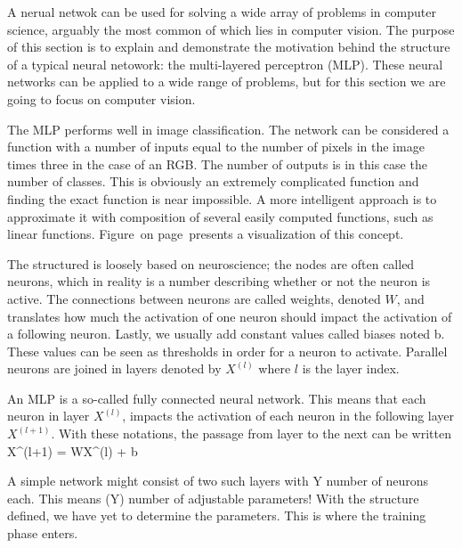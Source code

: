 \startsection[title=Neural network concepts]
A nerual netwok can be used for solving a wide array of problems in computer science, arguably the most common of which lies in computer vision.
The purpose of this section is to explain and demonstrate the motivation behind the structure of a typical neural netowork: the multi-layered perceptron (MLP).
These neural networks can be applied to a wide range of problems, but for this section we are going to focus on computer vision.

The MLP performs well in image classification.
The network can be considered a function with a number of inputs equal to the number of pixels in the image times three in the case of an RGB.
The number of outputs is in this case the number of classes.
This is obviously an extremely complicated function and finding the exact function is near impossible.
A more intelligent approach is to approximate it with composition of several easily computed functions, such as linear functions.
Figure~\in[concept] on page~\at[concept] presents a visualization of this concept.

\startplacefigure[reference=concept,
                  location=bottom,
                  title={A visual}]
\stopplacefigure

The structured is loosely based on neuroscience; the nodes are often called neurons, which in reality is a number describing whether or not the neuron is active.
The connections between neurons are called weights, denoted $W$, and translates how much the activation of one neuron should impact the activation of a following neuron.
Lastly, we usually add constant values called biases noted b. 
These values can be seen as thresholds in order for a neuron to activate. 
Parallel neurons are joined in layers denoted by $X^{(l)}$ where $l$ is the layer index.

An MLP is a so-called fully connected neural network. 
This means that each neuron in layer $X^{(l)}$, impacts the activation of each neuron in the following layer $X^{(l+1)}$.
With these notations, the passage from layer to the next can be written
\startplaceformula
\startformula
X^{(l+1)} = WX^{(l)} + b
\stopformula
\stopplaceformula

A simple network might consist of two such layers with Y number of neurons each.
This means (Y) number of adjustable parameters! With the structure defined, we have yet to determine the parameters.
This is where the training phase enters.  

